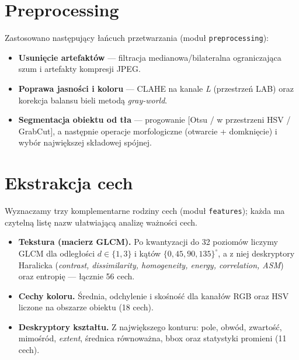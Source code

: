 \documentclass[10pt,a4paper]{article}
\begin{document}
\section{Preprocessing}
Zastosowano następujący łańcuch przetwarzania (moduł \texttt{preprocessing}):
\begin{itemize}\itemsep1pt
  \item \textbf{Usunięcie artefaktów} --- filtracja medianowa/bilateralna
        ograniczająca szum i artefakty kompresji JPEG.
  \item \textbf{Poprawa jasności i koloru} --- CLAHE na kanale \emph{L}
        (przestrzeń LAB) oraz korekcja balansu bieli metodą \emph{gray-world}.
  \item \textbf{Segmentacja obiektu od tła} --- progowanie [Otsu / w przestrzeni
        HSV / GrabCut], a następnie operacje morfologiczne (otwarcie + domknięcie)
        i wybór największej składowej spójnej.
\end{itemize}

\section{Ekstrakcja cech}
Wyznaczamy trzy komplementarne rodziny cech (moduł \texttt{features}); każda ma
czytelną listę nazw ułatwiającą analizę ważności cech.
\begin{itemize}\itemsep1pt
  \item \textbf{Tekstura (macierz GLCM).} Po kwantyzacji do \num{32} poziomów
        liczymy GLCM dla odległości $d\in\{1,3\}$ i kątów
        $\{0,45,90,135\}^\circ$, a z niej deskryptory Haralicka
        (\emph{contrast, dissimilarity, homogeneity, energy, correlation, ASM})
        oraz entropię --- łącznie \num{56} cech.
  \item \textbf{Cechy koloru.} Średnia, odchylenie i skośność dla kanałów RGB
        oraz HSV liczone na obszarze obiektu (\num{18} cech).
  \item \textbf{Deskryptory kształtu.} Z największego konturu: pole, obwód,
        zwartość, mimośród, \emph{extent}, średnica równoważna, bbox oraz
        statystyki promieni (\num{11} cech).
\end{itemize}
\end{document}
